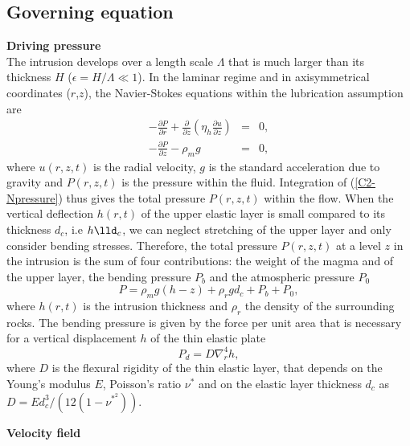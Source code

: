\subsection{Governing equation}
\label{C2-sec:Governing equation}

\textbf{Driving pressure}\\

The  intrusion develops  over a  length scale  $\Lambda$ that  is much
larger than its thickness $H$ ($\epsilon  = H/ \Lambda\ll 1$).  In the
laminar  regime  and  in  axisymmetrical  coordinates  ($r$,$z$),  the
Navier-Stokes equations within the lubrication assumption are
\begin{eqnarray}
  -\frac{\partial P}{\partial r}  +  \frac{\partial}{\partial z}\left(\eta_h \frac{\partial u}{\partial z}\right) &=&0,\label{C2_V1} \\
  -\frac{\partial P}{\partial z}  - \rho_{m}g&  =&0,\label{C2-Npressure}
\end{eqnarray}
where  $u(r,z,t)$  is  the  radial   velocity,  $g$  is  the  standard
acceleration due to gravity and  $P(r,z,t)$ is the pressure within the
fluid.   Integration  of  (\ref{C2-Npressure}) thus  gives  the  total
pressure  $P(r,z,t)$ within  the flow.   When the  vertical deflection
$h(r,t)$ of the upper elastic layer is small compared to its thickness
$d_c$, i.e $h\lld_c$, we can neglect stretching of the upper layer and
only  consider  bending  stresses.    Therefore,  the  total  pressure
$P(r,z,t)$  at  a level  $z$  in  the intrusion  is  the  sum of  four
contributions: the  weight of the  magma and  of the upper  layer, the
bending pressure $P_b$ and the atmospheric pressure $P_0$
\begin{equation}
  P = \rho_m g (h-z)+\rho_rgd_c+P_b+P_0,
  \label{C2-pression}
\end{equation}
where $h(r,t)$ is the intrusion  thickness and $\rho_r$ the density of
the surrounding rocks. The bending pressure  is given by the force per
unit area  that is necessary  for a  vertical displacement $h$  of the
thin elastic plate \citep{Turcotte:1982ca}
\begin{equation}
  P_d = D\nabla_r^4h,
\end{equation}
where $D$  is the flexural  rigidity of  the thin elastic  layer, that
depends on the Young's modulus $E$, Poisson's ratio $\nu^*$ and on the
elastic           layer          thickness           $d_c$          as
$D = Ed_c^3/\left(12(1-\nu^*^2)\right)$.

\vspace{.5cm} \textbf{Velocity field} \vspace{.5cm}

